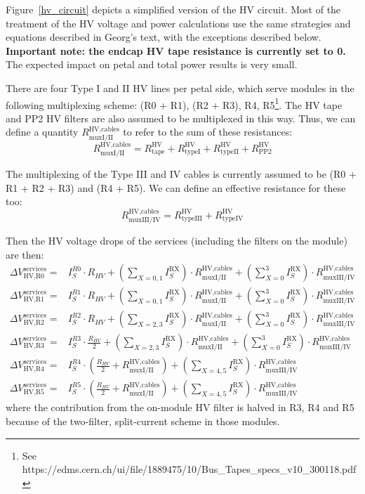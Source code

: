 Figure~\ref{hv_circuit} depicts a simplified version of the HV circuit. Most of the treatment of the
HV voltage and power calculations use the same strategies and equations described in Georg's text, with
the exceptions described below.
{ \bf Important note: the endcap HV tape resistance is currently set to 0. } The expected impact on petal
and total power results is very small.

\def\rhvmuxI{R^\text{HV,cables}_\text{muxI/II}}
\def\rhvmuxIII{R^\text{HV,cables}_\text{muxIII/IV}}

There are four Type I and II HV lines per petal side, which serve modules in the following multiplexing
scheme: (R0 + R1), (R2 + R3), R4, R5\footnote{ See
https://edms.cern.ch/ui/file/1889475/10/Bus\_Tapes\_specs\_v10\_300118.pdf
}. The HV tape and PP2 HV filters are also assumed to be multiplexed in this way. Thus, we can define
a quantity $\rhvmuxI$ to refer to the sum of these resistances:
%
\def\rtape{R^\text{HV}_\text{tape}}
\def\rtypeI{R^\text{HV}_\text{typeI}}
\def\rtypeII{R^\text{HV}_\text{typeII}}
\def\rtypeIII{R^\text{HV}_\text{typeIII}}
\def\rtypeIV{R^\text{HV}_\text{typeIV}}
\[
\rhvmuxI = \rtape + \rtypeI + \rtypeII + R^\text{HV}_\text{PP2}
\]

The multiplexing of the Type III and IV cables is currently
assumed to be (R0 + R1 + R2 + R3) and (R4 + R5). We can define an effective resistance for these
too:
\[
\rhvmuxIII = \rtypeIII + \rtypeIV
\]

Then the HV voltage drops of the services (including the filters on the module) are then:
\def\dvservices{\Delta V^\text{services}}
\begin{align}
\dvservices_\text{HV,R0} =& I^{R0}_S \cdot R_{HV}           + \left(\sum_{X=0,1} I^\text{RX}_S\right) \cdot \rhvmuxI + \left(\sum^3_{X=0} I^\text{RX}_S\right) \cdot \rhvmuxIII \\
\dvservices_\text{HV,R1} =& I^{R1}_S \cdot R_{HV}           + \left(\sum_{X=0,1} I^\text{RX}_S\right) \cdot \rhvmuxI + \left(\sum^3_{X=0} I^\text{RX}_S\right) \cdot \rhvmuxIII \\
\dvservices_\text{HV,R2} =& I^{R2}_S \cdot R_{HV}           + \left(\sum_{X=2,3} I^\text{RX}_S\right) \cdot \rhvmuxI + \left(\sum^3_{X=0} I^\text{RX}_S\right) \cdot \rhvmuxIII \\
\dvservices_\text{HV,R3} =& I^{R3}_S \cdot \frac{R_{HV}}{2} + \left(\sum_{X=2,3} I^\text{RX}_S\right) \cdot \rhvmuxI + \left(\sum^3_{X=0} I^\text{RX}_S\right) \cdot \rhvmuxIII \\
\dvservices_\text{HV,R4} =&                                I^{R4}_S \cdot \left(\frac{R_{HV}}{2} +\rhvmuxI \right)   + \left(\sum_{X=4,5} I^\text{RX}_S\right) \cdot \rhvmuxIII \\
\dvservices_\text{HV,R5} =&                                I^{R5}_S \cdot \left(\frac{R_{HV}}{2} +\rhvmuxI \right)   + \left(\sum_{X=4,5} I^\text{RX}_S\right) \cdot \rhvmuxIII
\end{align}
%
where the contribution from the on-module HV filter is halved in R3, R4 and R5 because of the
two-filter, split-current scheme in those modules.

